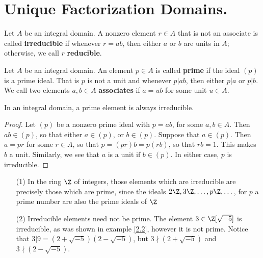 \section{Unique Factorization Domains.}

\begin{definition}
    Let $A$ be an integral domain. A nonzero element  $r \in A$ that is not an
    associate is called \textbf{irreducible} if whenever $r=ab$, then either $a$
    or $b$ are units in $A$; otherwise, we call $r$ \textbf{reducible}.
\end{definition}

\begin{definition}
    Let $A$ be an integral domain. An element $p \in A$ is called \textbf{prime}
    if the ideal $(p)$ is a prime ideal. That is $p$ is not a unit and whenever
     $p|ab$, then either  $p|a$ or $p|b$. We call two elements $a,b \in A$
     \textbf{associates} if $a=ub$ for some unit $u \in A$.
\end{definition}

\begin{lemma}\label{1.7.1}
    In an integral domain, a prime element is always irreducible.
\end{lemma}
\begin{proof}
    Let $(p)$ be a nonzero prime ideal with $p=ab$, for some  $a,b \in A$. Then
     $ab \in (p)$, so that either $a \in (p)$, or $b \in (p)$. Suppose that $a
     \in (p)$. Then $a=pr$ for some  $r \in A$, so that  $p=(pr)b=p(rb)$, so
     that $rb=1$. This makes $b$ a unit. Similarly, we see that $a$ is a unit if
      $b \in (p)$. In either case, $p$ is irreducible.
\end{proof}

\begin{example}\label{2.6}
    \begin{enumerate}
        \item[(1)] In the ring $\Z$ of integers, those elements which are
            irreducible are precisely those which are prime, since the ideals
            $2\Z, 3\Z, \dots, p\Z, \dots$, for  $p$ a prime number are also the
            prime ideals of $\Z$

        \item[(2)] Irreducible elements need not be prime. The element $3 \in
            \Z[\sqrt{-5}]$ is irreducible, as was shown in example \ref{2.2},
            however it is not prime. Notice that
            $3|9=(2+\sqrt{-5})(2-\sqrt{-5})$, but $3 \nmid (2+\sqrt{-5})$ and
            $3 \nmid (2-\sqrt{-5})$.
    \end{enumerate}
\end{example}


